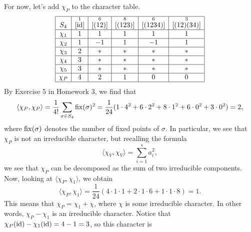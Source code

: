\begin{exmp}{}
    For now, let's add $\chi_P$ to the character table. 
    \begin{align*}
        \begin{array}{|c|c|c|c|c|c|}
            \hline
            S_4    & \overset{1}{[\operatorname{id}]} & \overset{6}{[(12)]} & \overset{8}{[(123)]} & \overset{6}{[(1234)]} & \overset{3}{[(12)(34)]} \\ \hline
            \chi_1 & 1                  & 1                   & 1                    & 1                     & 1                       \\ \hline
            \chi_2 & 1                  & -1                  & 1                    & -1                    & 1                       \\ \hline
            \chi_3 & 2                  & *                   & *                    & *                     & *                       \\ \hline
            \chi_4 & 3                  & *                   & *                    & *                     & *                       \\ \hline
            \chi_5 & 3                  & *                   & *                    & *                     & *                       \\ \hline
            \chi_P & 4                  & 2                   & 1                    & 0                     & 0                       \\ \hline 
        \end{array} 
    \end{align*}
    By Exercise 5 in Homework 3, we find that 
    \[ \langle \chi_P, \chi_P \rangle = \frac1{4!} \sum_{\sigma \in S_4} 
    \operatorname{fix}(\sigma)^2 = \frac1{24} (1 \cdot 4^2 + 6 \cdot 2^2 + 8 \cdot 1^2 + 6 
    \cdot 0^2 + 3 \cdot 0^2) = 2, \] 
    where $\operatorname{fix}(\sigma)$ denotes the number of fixed points of $\sigma$. 
    In particular, we see that $\chi_P$ is not an irreducible character, 
    but recalling the formula 
    \[ \langle \chi_V, \chi_V \rangle = \sum_{i=1}^s a_i^2, \] 
    we see that $\chi_P$ can be decomposed as the sum of two irreducible components. 
    Now, looking at $\langle \chi_P, \chi_1 \rangle$, we obtain 
    \[ \langle \chi_P, \chi_1 \rangle = \frac1{24} (4 \cdot 1 \cdot 1 
    + 2 \cdot 1 \cdot 6 + 1 \cdot 1 \cdot 8) = 1. \] 
    This means that $\chi_P = \chi_1 + \chi$, where $\chi$ is some irreducible 
    character. In other words, $\chi_P - \chi_1$ is an irreducible character. 
    Notice that $\chi_P(\operatorname{id}) - \chi_1(\operatorname{id}) = 4 - 1 = 3$, so this character is 

\end{exmp}
